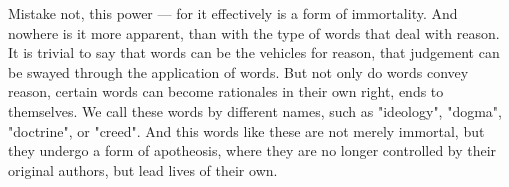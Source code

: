 Mistake not, this power --- for it effectively is a form of immortality. And nowhere is it more apparent, than with the type of words that deal with reason. It is trivial to say that words can be the vehicles for reason, that judgement can be swayed through the application of words. But not only do words convey reason, certain words can become rationales in their own right, ends to themselves. We call these words by different names, such as "ideology", "dogma", "doctrine", or "creed". And this words like these are not merely immortal, but they undergo a form of apotheosis, where they are no longer controlled by their original authors, but lead lives of their own.

